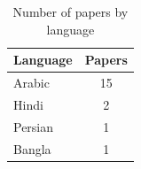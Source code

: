 \documentclass{article}
\begin{document}
	\begin{table}[]
		\centering
		\begin{tabular}{p{2in} c}
			\hline
			\textbf{Language} & \textbf{Papers} \\ \hline
			Arabic & 15 \\
			Hindi & 2 \\
			Persian & 1 \\
			Bangla & 1 \\
			\hline
		\end{tabular}
		\caption*{Number of papers by language}
		
		\label{tab:my_label}
	\end{table}
	
	
	

\end{document}
